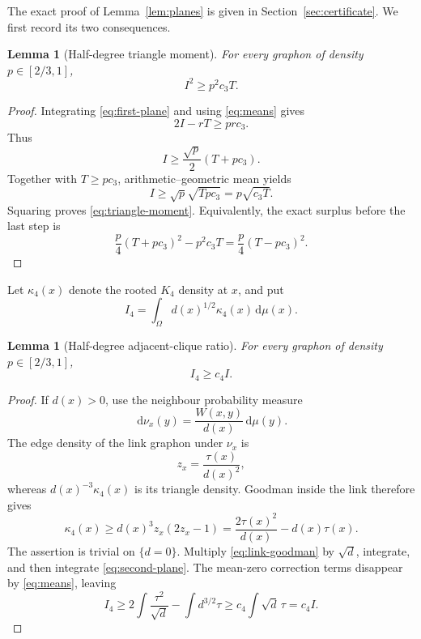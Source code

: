 \documentclass[11pt]{article}
\newtheorem{lemma}[theorem]{Lemma}
\newcommand{\dd}{\,\mathrm d}
\begin{document}
The exact proof of Lemma~\ref{lem:planes} is given in
Section~\ref{sec:certificate}.  We first record its two consequences.

\begin{lemma}[Half-degree triangle moment]\label{lem:triangle-moment}
For every graphon of density \(p\in[2/3,1]\),
\begin{equation}
 I^2\geq p^2c_3T.
 \label{eq:triangle-moment}
\end{equation}
\end{lemma}

\begin{proof}
Integrating \eqref{eq:first-plane} and using \eqref{eq:means} gives
\[
 2I-rT\geq prc_3.
\]
Thus
\[
 I\geq\frac{\sqrt p}{2}(T+pc_3).
\]
Together with \(T\geq pc_3\), arithmetic--geometric mean yields
\[
 I\geq \sqrt p\sqrt{Tpc_3}=p\sqrt{c_3T}.
\]
Squaring proves \eqref{eq:triangle-moment}.  Equivalently, the exact surplus
before the last step is
\[
 \frac p4(T+pc_3)^2-p^2c_3T
 =\frac p4(T-pc_3)^2.
\]
\end{proof}

Let \(\kappa_4(x)\) denote the rooted \(K_4\) density at \(x\), and put
\[
 I_4=\int_\Omega d(x)^{1/2}\kappa_4(x)\dd\mu(x).
\]

\begin{lemma}[Half-degree adjacent-clique ratio]\label{lem:k4-ratio}
For every graphon of density \(p\in[2/3,1]\),
\begin{equation}
 I_4\geq c_4 I.
 \label{eq:k4-ratio}
\end{equation}
\end{lemma}

\begin{proof}
If \(d(x)>0\), use the neighbour probability measure
\[
 \dd\nu_x(y)=\frac{W(x,y)}{d(x)}\dd\mu(y).
\]
The edge density of the link graphon under \(\nu_x\) is
\[
 z_x=\frac{\tau(x)}{d(x)^2},
\]
whereas \(d(x)^{-3}\kappa_4(x)\) is its triangle density.  Goodman inside
the link therefore gives
\begin{equation}
 \kappa_4(x)\geq
 d(x)^3z_x(2z_x-1)
 =\frac{2\tau(x)^2}{d(x)}-d(x)\tau(x).
 \label{eq:link-goodman}
\end{equation}
The assertion is trivial on \(\{d=0\}\).  Multiply
\eqref{eq:link-goodman} by \(\sqrt d\), integrate, and then integrate
\eqref{eq:second-plane}.  The mean-zero correction terms disappear by
\eqref{eq:means}, leaving
\[
 I_4
 \geq
 2\int\frac{\tau^2}{\sqrt d}
 -\int d^{3/2}\tau
 \geq c_4\int\sqrt d\,\tau
 =c_4I.
\]
\end{proof}
\end{document}
